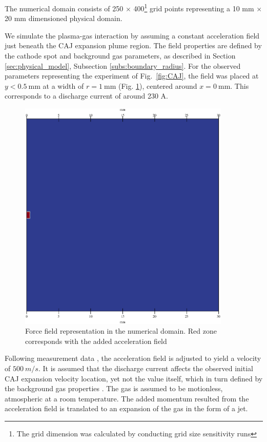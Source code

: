 \documentclass[a4paper]{iacas}%
\begin{document}
The numerical domain consists of 250 $\times$ 400\footnote{The grid dimension was calculated by conducting grid size sensitivity runs} grid points representing a 10 mm $\times$ 20 mm dimensioned physical domain. 

We simulate the plasma-gas interaction by assuming a constant acceleration field just beneath the CAJ expansion plume region. The field properties are defined by the cathode spot and background gas parameters, as described in Section \ref{sec:physical_model}, Subsection \ref{subs:boundary_radius}. For the observed parameters representing the experiment \cite{KR} of Fig.~\ref{fig:CAJ}, the field was placed at $ y < 0.5~ \mathrm{mm} $ at a width of $r = 1~\mathrm{mm}$ (Fig. \ref{fig:force_field}), centered around $x=0~\mathrm{mm}$. This corresponds to a discharge current of around 230 A.

\begin{figure}[htbp]
	\centering
	\includegraphics[width=0.9\textwidth]{forceField}
	\caption{Force field representation in the numerical domain. Red zone corresponds with the added acceleration field}\label{fig:force_field}
\end{figure}

Following measurement data \cite{KRClose}, the acceleration field is adjusted to yield a velocity of $500~ m/s$. It is assumed that the discharge current affects the observed initial CAJ expansion velocity location, yet not the value itself, which in turn defined by the background gas properties \cite{KR,KRClose,KRFar}. The gas is assumed to be motionless, atmospheric at a room temperature. The added momentum resulted from the acceleration field is translated to an expansion of the gas in the form of a jet.
\end{document}
